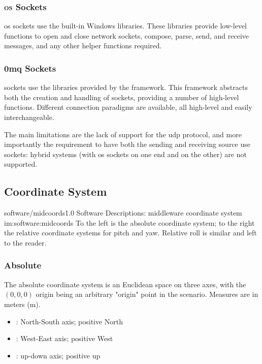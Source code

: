 \subsubsection{\textsc{os} Sockets}

\gls{os} sockets use the built-in Windows  libraries. These libraries provide low-level functions to open and close network sockets, compose, parse, send, and receive messages, and any other helper functions required.

\subsubsection{0mq Sockets}

 sockets use the libraries provided by the  framework. This framework abstracts both the creation and handling of sockets, providing a number of high-level functions. Different connection paradigms are available, all high-level and easily interchangeable.

The main limitations are the lack of support for the \gls{udp} protocol, and more importantly the requirement to have both the sending and receiving source use  sockets: hybrid systems (with \gls{os} sockets on one end and  on the other) are not supported.

\subsection{Coordinate System}

\begin{image}
	{software/midcoords}{1.0}
	{Software Descriptions: \gls{middleware} coordinate system}
	{im:software:midcoords}
	{}
	{To the left is the absolute coordinate system; to the right the relative coordinate systems for pitch and yaw. Relative roll is similar and left to the reader.}
\end{image}

\subsubsection{Absolute}

The absolute coordinate system is an Euclidean space on three axes, with the $(0,0,0)$ origin being an arbitrary "origin" point in the scenario. Measures are in meters (\si{\meter}).

\begin{itemize}
	\item {}: North-South axis; positive North
	\item {}: West-East axis; positive West
	\item {}: up-down axis; positive up
\end{itemize}

